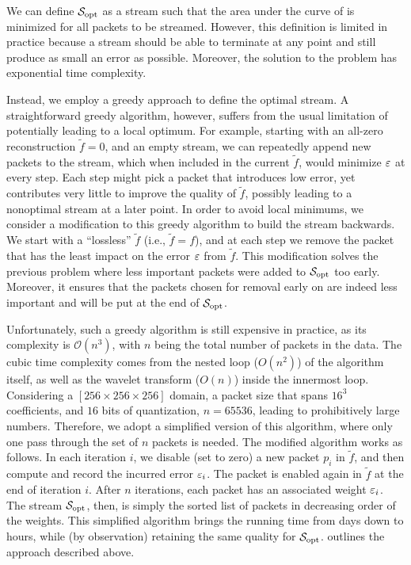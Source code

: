 We can define $\sopt$ as a stream such that the area under the curve of \err is minimized for all
packets to be streamed. However, this definition is limited in practice because a stream should be
able to terminate at any point and still produce as small an error as possible. Moreover, the
solution to the problem has exponential time complexity.

Instead, we employ a greedy approach to define the optimal stream.  A straightforward greedy
algorithm, however, suffers from the usual limitation of potentially leading to a local optimum. For
example, starting with an all-zero reconstruction $\tilde{f}=0$, and an empty stream, we can
repeatedly append new packets to the stream, which when included in the current $\tilde{f}$, would
minimize $\err$ at every step. Each step might pick a packet that introduces low error, yet
contributes very little to improve the quality of $\tilde{f}$, possibly leading to a nonoptimal
stream at a later point. In order to avoid local minimums, we consider a modification to this greedy
algorithm to build the stream backwards. We start with a ``lossless'' $\tilde{f}$ (i.e.,
$\tilde{f}=f$), and at each step we remove the packet that has the least impact on the error $\err$
from $\tilde{f}$. This modification solves the previous problem where less important packets were
added to $\sopt$ too early. Moreover, it ensures that the packets chosen for removal early on are
indeed less important and will be put at the end of $\sopt$.

Unfortunately, such a greedy algorithm is still expensive in practice, as its complexity is
$\mathcal{O}(n^3)$, with $n$ being the total number of packets in the data. The cubic time
complexity comes from the nested loop ($O(n^2)$) of the algorithm itself, as well as the wavelet
transform ($O(n)$) inside the innermost loop. Considering a $[256 \times 256 \times 256]$ domain, a
packet size that spans $16^3$ coefficients, and $16$ bits of quantization, $n = 65536$, leading to
prohibitively large numbers. Therefore, we adopt a simplified version of this algorithm, where only
one pass through the set of $n$ packets is needed. The modified algorithm works as follows. In each
iteration $i$, we disable (set to zero) a new packet $p_i$ in $\tilde{f}$, and then compute and record
the incurred error $\err_i$. The packet is enabled again in $\tilde{f}$ at the end of iteration $i$.
After $n$ iterations, each packet has an associated weight $\err_i$.  The stream $\sopt$, then, is
simply the sorted list of packets in decreasing order of the weights. This simplified algorithm
brings the running time from days down to hours, while (by observation) retaining the same quality
for $\sopt$.  outlines the approach described above.

